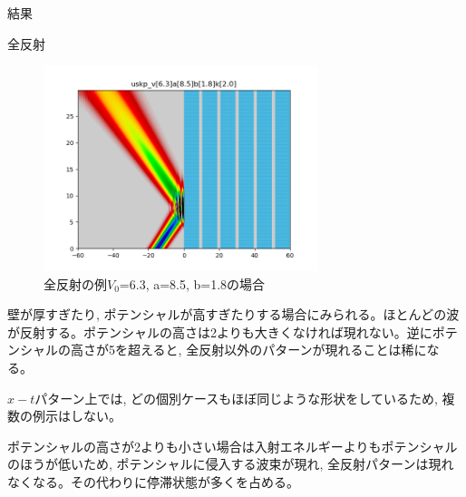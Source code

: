 \documentclass[a4paper, lualatex]{bxjsarticle}
\begin{document}
\begin{section}{結果}
    \begin{subsection}{全反射}
        \begin{figure}[h]
            \centering
            \includegraphics[width=8cm]{zenhansha.png}
            \caption{全反射の例$V_0$=6.3, a=8.5, b=1.8の場合}
        \end{figure}
    \par 壁が厚すぎたり, ポテンシャルが高すぎたりする場合にみられる。ほとんどの波が反射する。ポテンシャルの高さは2よりも大きくなければ現れない。逆にポテンシャルの高さが5を超えると, 全反射以外のパターンが現れることは稀になる。
    \par$x-t$パターン上では, どの個別ケースもほぼ同じような形状をしているため, 複数の例示はしない。
    \par ポテンシャルの高さが2よりも小さい場合は入射エネルギーよりもポテンシャルのほうが低いため, ポテンシャルに侵入する波束が現れ, 全反射パターンは現れなくなる。その代わりに停滞状態が多くを占める。
    \end{subsection}


\end{section}
\end{document}
